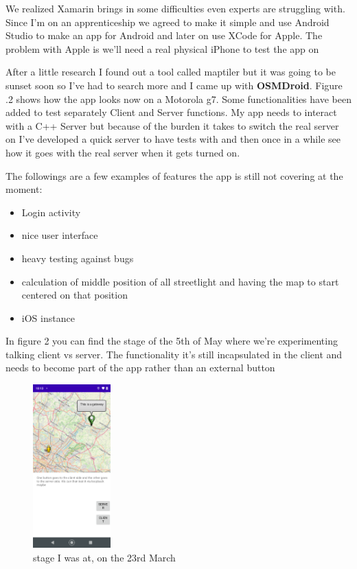 \documentclass[a4paper,12pt]{article}
\begin{document}
\noindent We realized Xamarin brings in some difficulties even experts are struggling with. Since I'm on an apprenticeship we agreed to make it simple and use Android Studio to make an app for Android and later on use XCode for Apple. The problem with Apple is we'll need a real physical iPhone to test the app on

After a little research I found out a tool called maptiler but it was going to be sunset soon so I've had to search more and I came up with \textbf{OSMDroid}. Figure .2 shows how the app looks now on a Motorola g7. Some functionalities have been added to test separately Client and Server functions. My app needs to interact with a C++ Server but because of the burden it takes to switch the real server on I've developed a quick server to have tests with and then once in a while see how it goes with the real server when it gets turned on.

The followings are a few examples of features the app is still not covering at the moment:

\begin{itemize}
\item{Login activity}
\item{nice user interface}
\item{heavy testing against bugs}
\item{calculation of middle position of all streetlight and having the map to start centered on that position}
\item{iOS instance}
\end{itemize}

\clearpage

In figure 2 you can find the stage of the 5th of May where we're experimenting talking client vs server. The functionality it's still incapsulated in the client and needs to become part of the app rather than an external button
\begin{figure}
\centering
\includegraphics[width=3cm]{./current_status_g7.PNG}
\caption{stage I was at, on the 23rd March}\label{wrap-fig:2}
\end{figure}
\end{document}
